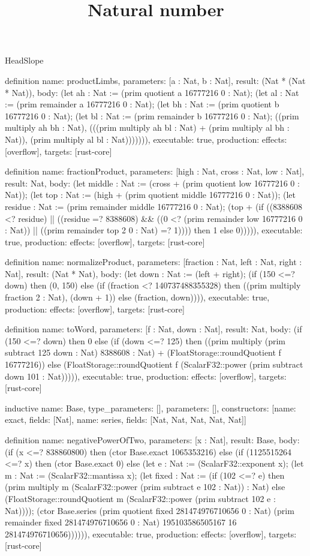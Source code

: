 \begin{lexlean}{HeadSlope}
\title{Natural number}
\begin{semanticmodule}
definition{
  name: productLimbs,
  parameters: [a : Nat, b : Nat],
  result: (Nat * (Nat * Nat)),
  body: (let ah : Nat := (prim quotient a 16777216 0 : Nat); (let al : Nat := (prim remainder a 16777216 0 : Nat); (let bh : Nat := (prim quotient b 16777216 0 : Nat); (let bl : Nat := (prim remainder b 16777216 0 : Nat); ((prim multiply ah bh : Nat), (((prim multiply ah bl : Nat) + (prim multiply al bh : Nat)), (prim multiply al bl : Nat))))))),
  executable: true,
  production: {effects: [overflow], targets: [rust-core]}
}

definition{
  name: fractionProduct,
  parameters: [high : Nat, cross : Nat, low : Nat],
  result: Nat,
  body: (let middle : Nat := (cross + (prim quotient low 16777216 0 : Nat)); (let top : Nat := (high + (prim quotient middle 16777216 0 : Nat)); (let residue : Nat := (prim remainder middle 16777216 0 : Nat); (top + (if ((8388608 <? residue) || ((residue =? 8388608) && ((0 <? (prim remainder low 16777216 0 : Nat)) || ((prim remainder top 2 0 : Nat) =? 1)))) then 1 else 0))))),
  executable: true,
  production: {effects: [overflow], targets: [rust-core]}
}

definition{
  name: normalizeProduct,
  parameters: [fraction : Nat, left : Nat, right : Nat],
  result: (Nat * Nat),
  body: (let down : Nat := (left + right); (if (150 <=? down) then (0, 150) else (if (fraction <? 140737488355328) then ((prim multiply fraction 2 : Nat), (down + 1)) else (fraction, down)))),
  executable: true,
  production: {effects: [overflow], targets: [rust-core]}
}

definition{
  name: toWord,
  parameters: [f : Nat, down : Nat],
  result: Nat,
  body: (if (150 <=? down) then 0 else (if (down <=? 125) then ((prim multiply (prim subtract 125 down : Nat) 8388608 : Nat) + (FloatStorage::roundQuotient f 16777216)) else (FloatStorage::roundQuotient f (ScalarF32::power (prim subtract down 101 : Nat))))),
  executable: true,
  production: {effects: [overflow], targets: [rust-core]}
}

inductive{
  name: Base,
  type_parameters: [],
  parameters: [],
  constructors: [{name: exact, fields: [Nat]}, {name: series, fields: [Nat, Nat, Nat, Nat, Nat]}]
}

definition{
  name: negativePowerOfTwo,
  parameters: [x : Nat],
  result: Base,
  body: (if (x <=? 838860800) then (ctor Base.exact 1065353216) else (if (1125515264 <=? x) then (ctor Base.exact 0) else (let e : Nat := (ScalarF32::exponent x); (let m : Nat := (ScalarF32::mantissa x); (let fixed : Nat := (if (102 <=? e) then (prim multiply m (ScalarF32::power (prim subtract e 102 : Nat)) : Nat) else (FloatStorage::roundQuotient m (ScalarF32::power (prim subtract 102 e : Nat)))); (ctor Base.series (prim quotient fixed 281474976710656 0 : Nat) (prim remainder fixed 281474976710656 0 : Nat) 195103586505167 16 281474976710656)))))),
  executable: true,
  production: {effects: [overflow], targets: [rust-core]}
}


\end{semanticmodule}
\end{lexlean}
